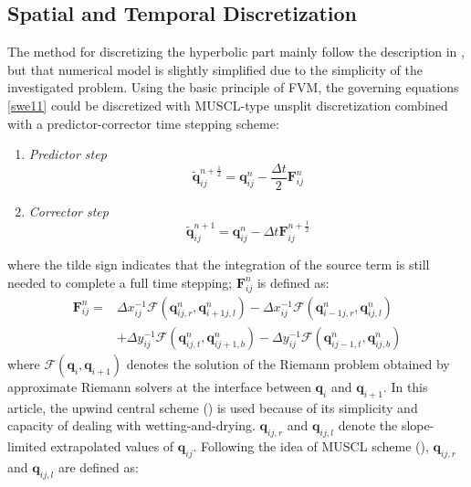 \documentclass{jfm}
\begin{document}
\subsection{Spatial and Temporal Discretization}
The method for discretizing the hyperbolic part mainly follow the description in \cite{Popinet2011}, but that numerical model is slightly simplified due to the simplicity of the investigated problem. Using the basic principle of FVM, the governing equations  \autoref{swe11} could be discretized with MUSCL-type unsplit discretization combined with a predictor-corrector time stepping scheme:
\begin{enumerate}
\item \textit{Predictor step}
\begin{equation}
\tilde{\pmb{q}}_{ij}^{n+\frac{1}{2}} = \pmb{q}_{ij}^{n} - \frac{\Delta t}{2} \pmb{{F}}^n_{ij}
\label{hyper_part_ps}
\end{equation}
\item \textit{Corrector step}
\begin{equation}
\tilde{\pmb{q}}_{ij}^{n+1} = \pmb{q}_{ij}^{n} - \Delta t \pmb{{F}}^{n+\frac{1}{2}}_{ij}
\label{hyper_part_cs}
\end{equation}
\end{enumerate}
where the tilde sign indicates that the integration of the source term is still needed to complete a full time stepping; $\pmb{{F}}^{n }_{ij}$ is defined as:
\begin{equation}
\begin{split}
\pmb{{F}}^{n }_{ij} = &\Delta x_{ij}^{-1}\pmb{\mathcal{F}}(\pmb{q}_{ij,r}^{n}, \pmb{q}_{i+1j,l}^{n}) - \Delta x_{ij}^{-1}\pmb{\mathcal{F}}(\pmb{q}_{i-1j,r}^{n}, \pmb{q}_{ij,l}^{n}) \\
						& +\Delta y_{ij}^{-1}\pmb{\mathcal{F}}(\pmb{q}_{ij,t}^{n}, \pmb{q}_{ij+1,b}^{n})-\Delta y_{ij}^{-1}\pmb{\mathcal{F}}(\pmb{q}_{ij-1,t}^{n}, \pmb{q}_{ij,b}^{n})
\end{split}
\end{equation}
where $\pmb{\mathcal{F}}(\pmb{q}_i, \pmb{q}_{i+1})$ denotes the solution of the Riemann problem obtained by approximate Riemann solvers at the interface between $\pmb{q}_i$ and $\pmb{q}_{i+1}$. In this article, the  upwind central scheme (\cite{Kurganov2002}) is used  because of its simplicity and capacity of dealing with wetting-and-drying. $\pmb{q}_{ij,r}$ and $\pmb{q}_{ij,l}$ denote the slope-limited extrapolated values of $\pmb{q}_{ij}$. Following the idea of MUSCL scheme (\cite{Toro2001}), $\pmb{q}_{ij,r}$ and $\pmb{q}_{ij,l}$ are defined as:
\end{document}
